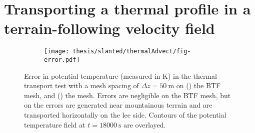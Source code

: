 \section{Transporting a thermal profile in a terrain-following velocity field}


\begin{figure}
	\centering
	\begin{subfigure}{\textwidth}
		\centering
		\texttt{[image: thesis/slanted/thermalAdvect/fig-error.pdf]}
		\label{fig:slanted:thermalAdvect:error:btf}
		\label{fig:slanted:thermalAdvect:error:cutCell}
	\end{subfigure}
	\caption{Error in potential temperature (measured in \si{\kelvin}) in the thermal transport test with a mesh spacing of $\Delta z = \SI{50}{\meter}$ on
	() the BTF mesh, and
	() the  mesh.
	Errors are negligible on the BTF mesh, but on the  errors are generated near mountainous terrain and are transported horizontally on the lee side.  Contours of the potential temperature field at $t = \SI{18000}{\second}$ are overlayed.}
	\label{fig:slanted:thermalAdvect:error}
\end{figure}
